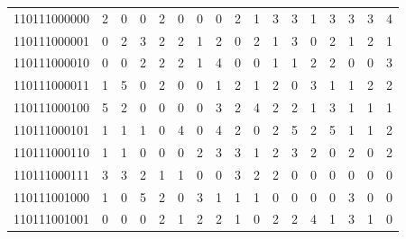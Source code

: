 \documentclass[10pt,a4paper]{article}
\begin{document}
\begin{longtable}{ |c|c|c|c|c|c|c|c|c|c|c|c|c|c|c|c|c| }
    110111000000              & 2                            & 0                                & 0                            & 2                              & 0   & 0   & 0   & 2   & 1   & 3   & 3   & 1   & 3   & 3   & 3   & 4   \\
    110111000001              & 0                            & 2                                & 3                            & 2                              & 2   & 1   & 2   & 0   & 2   & 1   & 3   & 0   & 2   & 1   & 2   & 1   \\
    110111000010              & 0                            & 0                                & 2                            & 2                              & 2   & 1   & 4   & 0   & 0   & 1   & 1   & 2   & 2   & 0   & 0   & 3   \\
    110111000011              & 1                            & 5                                & 0                            & 2                              & 0   & 0   & 1   & 2   & 1   & 2   & 0   & 3   & 1   & 1   & 2   & 2   \\
    110111000100              & 5                            & 2                                & 0                            & 0                              & 0   & 0   & 3   & 2   & 4   & 2   & 2   & 1   & 3   & 1   & 1   & 1   \\
    110111000101              & 1                            & 1                                & 1                            & 0                              & 4   & 0   & 4   & 2   & 0   & 2   & 5   & 2   & 5   & 1   & 1   & 2   \\
    110111000110              & 1                            & 1                                & 0                            & 0                              & 0   & 2   & 3   & 3   & 1   & 2   & 3   & 2   & 0   & 2   & 0   & 2   \\
    110111000111              & 3                            & 3                                & 2                            & 1                              & 1   & 0   & 0   & 3   & 2   & 2   & 0   & 0   & 0   & 0   & 0   & 0   \\
    110111001000              & 1                            & 0                                & 5                            & 2                              & 0   & 3   & 1   & 1   & 1   & 0   & 0   & 0   & 0   & 3   & 0   & 0   \\
    110111001001              & 0                            & 0                                & 0                            & 2                              & 1   & 2   & 2   & 1   & 0   & 2   & 2   & 4   & 1   & 3   & 1   & 0   \\

\end{longtable}
\end{document}
